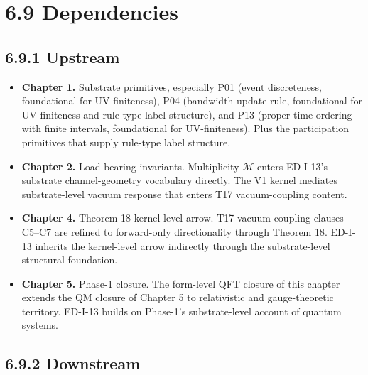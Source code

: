 \documentclass[11pt]{book}
\begin{document}
\section{6.9 Dependencies}

\subsection{6.9.1 Upstream}

\begin{itemize}
\item \textbf{Chapter 1.} Substrate primitives, especially P01 (event discreteness, foundational for UV-finiteness), P04 (bandwidth update rule, foundational for UV-finiteness and rule-type label structure), and P13 (proper-time ordering with finite intervals, foundational for UV-finiteness). Plus the participation primitives that supply rule-type label structure.
\item \textbf{Chapter 2.} Load-bearing invariants. Multiplicity $\mathcal{M}$ enters ED-I-13's substrate channel-geometry vocabulary directly. The V1 kernel mediates substrate-level vacuum response that enters T17 vacuum-coupling content.
\item \textbf{Chapter 4.} Theorem 18 kernel-level arrow. T17 vacuum-coupling clauses C5–C7 are refined to forward-only directionality through Theorem 18. ED-I-13 inherits the kernel-level arrow indirectly through the substrate-level structural foundation.
\item \textbf{Chapter 5.} Phase-1 closure. The form-level QFT closure of this chapter extends the QM closure of Chapter 5 to relativistic and gauge-theoretic territory. ED-I-13 builds on Phase-1's substrate-level account of quantum systems.
\end{itemize}

\subsection{6.9.2 Downstream}
\end{document}
